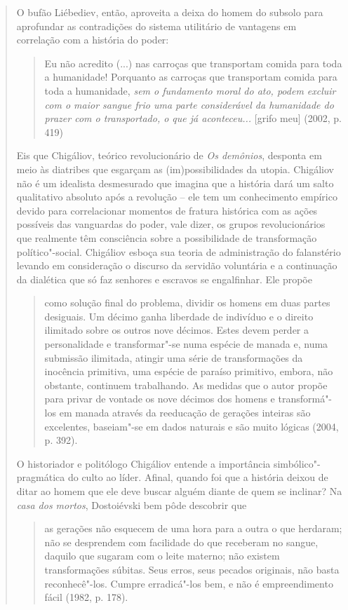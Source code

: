 {\begin{quote}
O bufão Liébediev, então, aproveita a deixa do homem do subsolo para
aprofundar as contradições do sistema utilitário de vantagens em
correlação com a história do poder:

\begin{quote}
Eu não acredito (...) nas carroças que transportam comida para toda a
humanidade! Porquanto as carroças que transportam comida para toda a
humanidade, \emph{sem o fundamento moral do ato, podem excluir com o
maior sangue frio uma parte considerável da humanidade do prazer com o
transportado, o que já aconteceu...} {[}grifo meu{]} (2002, p. 419)
\end{quote}

Eis que Chigáliov, teórico revolucionário de \emph{Os demônios},
desponta em meio às diatribes que esgarçam as (im)possibilidades da
utopia. Chigáliov não é um idealista desmesurado que imagina que a
história dará um salto qualitativo absoluto após a revolução -- ele tem
um conhecimento empírico devido para correlacionar momentos de fratura
histórica com as ações possíveis das vanguardas do poder, vale dizer, os
grupos revolucionários que realmente têm consciência sobre a
possibilidade de transformação político"-social. Chigáliov esboça sua
teoria de administração do falanstério levando em consideração o
discurso da servidão voluntária e a continuação da dialética que só faz
senhores e escravos se engalfinhar. Ele propõe

\begin{quote}
como solução final do problema, dividir os homens em duas partes
desiguais. Um décimo ganha liberdade de indivíduo e o direito ilimitado
sobre os outros nove décimos. Estes devem perder a personalidade e
transformar"-se numa espécie de manada e, numa submissão ilimitada,
atingir uma série de transformações da inocência primitiva, uma espécie
de paraíso primitivo, embora, não obstante, continuem trabalhando. As
medidas que o autor propõe para privar de vontade os nove décimos dos
homens e transformá"-los em manada através da reeducação de gerações
inteiras são excelentes, baseiam"-se em dados naturais e são muito
lógicas (2004, p. 392).
\end{quote}

O historiador e politólogo Chigáliov entende a importância
simbólico"-pragmática do culto ao líder. Afinal, quando foi que a
história deixou de ditar ao homem que ele deve buscar alguém diante de
quem se inclinar? Na \emph{casa dos mortos}, Dostoiévski bem pôde
descobrir que

\begin{quote}
as gerações não esquecem de uma hora para a outra o que herdaram; não se
desprendem com facilidade do que receberam no sangue, daquilo que
sugaram com o leite materno; não existem transformações súbitas. Seus
erros, seus pecados originais, não basta reconhecê"-los. Cumpre
erradicá"-los bem, e não é empreendimento fácil (1982, p. 178).
\end{quote}


\end{quote}}
